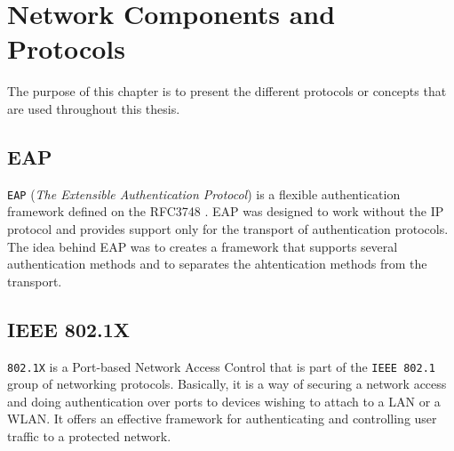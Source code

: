 
\chapter{Network Components and Protocols} %

\label{Chapter3} %


The purpose of this chapter is to present the different protocols or concepts that are used throughout this thesis.

\section{EAP}
\texttt{EAP} (\textit{The Extensible Authentication Protocol}) is a flexible authentication framework defined on the RFC3748 \cite{rfc3748}. EAP was designed to work without the IP protocol and provides support only for the transport of authentication protocols. The idea behind EAP was to creates a framework that supports several authentication methods and to separates the ahtentication methods from the transport.

\section{IEEE 802.1X}
\texttt{802.1X} is a Port-based Network Access Control that is part of the \texttt{IEEE 802.1} group of networking protocols. Basically, it is a way of securing a network access and doing authentication over ports to devices wishing to attach to a LAN or a WLAN. It offers an effective framework for authenticating and controlling user traffic to a protected network.

